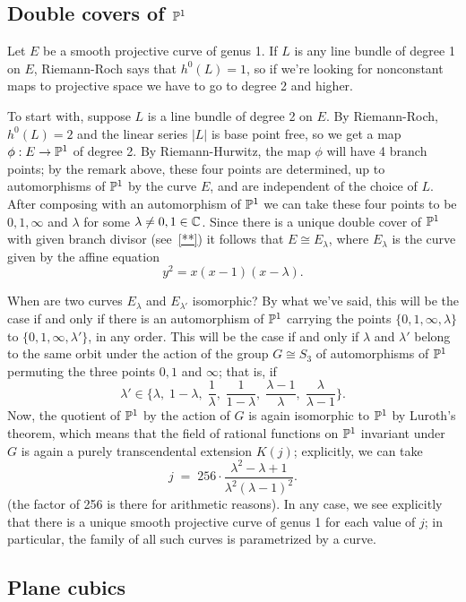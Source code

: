 \subsection{Double covers of $\PP^1$}

Let $E$ be a smooth projective curve of genus 1. If $L$ is any line bundle of degree 1 on $E$, Riemann-Roch says that $h^0(L) = 1$, so if we're looking for nonconstant maps to projective space we have to go to degree 2 and higher.

To start with, suppose $L$ is a line bundle of degree 2 on $E$. By Riemann-Roch, $h^0(L) = 2$ and the linear series $|L|$ is base point free, so we get a map $\phi : E \to \PP^1$ of degree 2. By Riemann-Hurwitz, the map $\phi$ will have 4 branch points; by the remark above, these four points are determined, up to automorphisms of $\PP^1$ by the curve $E$, and are independent of the choice of $L$.
After composing with an automorphism of $\PP^1$ we can take these four points to be $0, 1, \infty$ and $\lambda$ for some $\lambda \neq 0, 1 \in \CC$. Since there is a unique double cover of $\PP^1$ with given branch divisor (see~\ref{**}) it follows that $E \cong E_\lambda$, where $E_\lambda$ is the curve given by the affine equation
$$
y^2 = x(x-1)(x-\lambda).
$$

When are two curves $E_\lambda$ and $E_{\lambda'}$ isomorphic? By what we've said, this will be the case if and only if there is an automorphism of $\PP^1$ carrying the points $\{0,1,\infty,\lambda\}$ to $\{0,1,\infty,\lambda'\}$, in any order. This will be the case if and only if $\lambda$ and $\lambda'$ belong to the same orbit under the action of the group $G \cong S_3$ of automorphisms of $\PP^1$ permuting the three points $0, 1$ and $\infty$; that is, if
$$
\lambda' \in \{\lambda, \; 1-\lambda, \; \frac{1}{\lambda},\;  \frac{1}{1-\lambda}, \; \frac{\lambda - 1}{\lambda}, \; \frac{\lambda}{\lambda - 1} \}.
$$
Now, the quotient of $\PP^1$ by the action of $G$ is again isomorphic to $\PP^1$ by Luroth's theorem, which means that the field of rational functions on $\PP^1$ invariant under $G$ is again a purely transcendental extension $K(j)$; explicitly, we can take
$$
j \; = \; 256\cdot \frac{\lambda^2 - \lambda + 1}{\lambda^2(\lambda - 1)^2}.
$$
(the factor of 256 is there for arithmetic reasons). In any case, we see explicitly that there is a unique smooth projective curve of genus 1 for each value of $j$; in particular, the family of all such curves is parametrized by a curve.

\subsection{Plane cubics}

